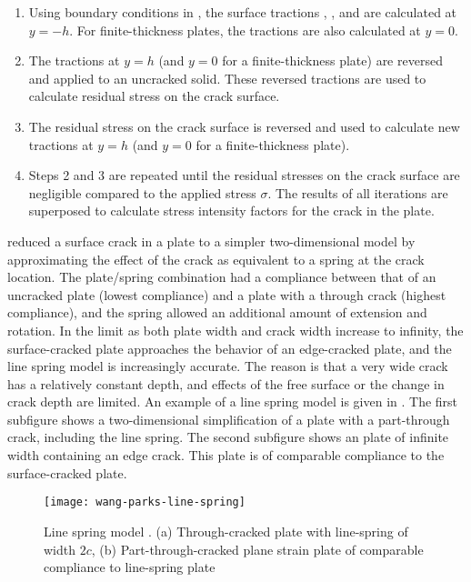 \begin{enumerate}
\item Using boundary conditions in , the surface tractions \Syy, \Sxy{}, and \Syz{} are calculated at \(y=-h\). For fi\-nite-thick\-ness plates, the tractions are also calculated at \(y=0\).
\item The tractions at \(y=h\) (and \(y=0\) for a fi\-nite-thick\-ness plate) are reversed and applied to an uncracked solid. These reversed tractions are used to calculate residual stress \Szz{} on the crack surface.
\item The residual stress \Szz on the crack surface is reversed and used to calculate new tractions at \(y=h\) (and \(y=0\) for a fi\-nite-thick\-ness plate).
\item Steps 2 and 3 are repeated until the residual stresses on the crack surface are negligible compared to the applied stress \(\sigma\). The results of all iterations are superposed to calculate stress intensity factors for the crack in the plate.
\end{enumerate}

\citet{rice1972a} reduced a surface crack in a plate to a simpler two-dimensional model by approximating the effect of the crack as equivalent to a spring at the crack location.
The plate/spring combination had a compliance between that of an uncracked plate (lowest compliance) and a plate with a through crack (highest compliance), and the spring allowed an additional amount of extension and rotation.
In the limit as both plate width and crack width increase to infinity, the surface-cracked plate approaches the behavior of an edge-cracked plate, and the line spring model is increasingly accurate.
The reason is that a very wide crack has a relatively constant depth, and effects of the free surface or the change in crack depth are limited.
An example of a line spring model is given in .
The first subfigure shows a two-dimensional simplification of a plate with a part-through crack, including the line spring.
The second subfigure shows an plate of infinite width containing an edge crack.
This plate is of comparable compliance to the surface-cracked plate.
\begin{figure}[tbp]
\centering
\texttt{[image: wang-parks-line-spring]}
\caption[Line spring model]{\label{fig:wang-parks-line-spring} Line spring model \citep{wangparks1992}. (a) Through-cracked plate with line-spring of width \(2c\), (b) Part-through-cracked plane strain plate of comparable compliance to line-spring plate}
\end{figure}

